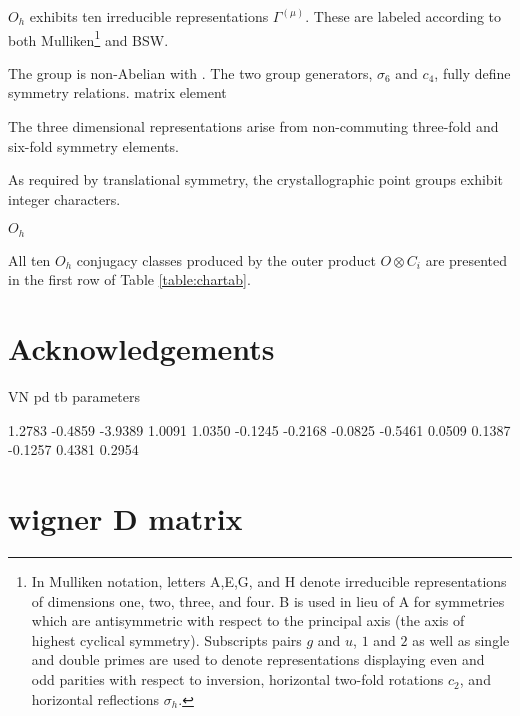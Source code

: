 \documentclass[twocolumn,showpacs,preprintnumbers,superscriptaddress,prb,floatfix,aps,10pt]{revtex4-1}
\begin{document}
$O_h$ exhibits ten irreducible representations $\Gamma^{(\mu)}$. These are labeled according to both Mulliken\footnote{In Mulliken notation, letters A,E,G, and H denote irreducible representations of dimensions one, two, three, and four. B is used in lieu of A for symmetries which are antisymmetric with respect to the principal axis (the axis of highest cyclical symmetry). Subscripts pairs $g$ and $u$, $1$ and $2$ as well as single and double primes are used to denote representations displaying even and odd parities with respect to inversion, horizontal two-fold rotations $c_2$, and horizontal reflections $\sigma_h$.} and BSW.


The group is non-Abelian with . The two group generators, $\sigma_6$ and $c_4$, fully define symmetry relations.
matrix element 


The three dimensional representations arise from non-commuting three-fold and six-fold symmetry elements. 




As required by translational symmetry, the crystallographic point groups exhibit integer characters.







$O_h$



All ten $O_h$ conjugacy classes produced by the outer product $O \otimes C_i$ are presented in the first row of Table \ref{table:chartab}.







\section{Acknowledgements}



\clearpage

VN pd tb parameters

    1.2783
   -0.4859
   -3.9389
    1.0091
    1.0350
   -0.1245
   -0.2168
   -0.0825
   -0.5461
    0.0509
    0.1387
   -0.1257
    0.4381
    0.2954




\appendix

%
%
\section{wigner D matrix} 
\label{appendix:wigner}
\end{document}
